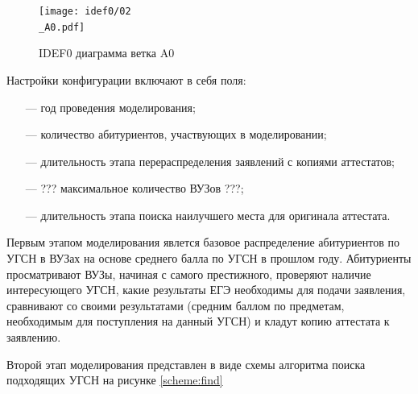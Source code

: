 \begin{figure}[hbtp]
	\centering
	\texttt{[image: idef0/02\\\_A0.pdf]}
	\caption{IDEF0 диаграмма ветка A0}
	\label{A0}
\end{figure}

Настройки конфигурации включают в себя поля:

\begin{itemize}[leftmargin=1.6\parindent]
	\item[---] год проведения моделирования;
	\item[---] количество абитуриентов, участвующих в моделировании;
	\item[---] длительность этапа перераспределения заявлений с копиями аттестатов;
	\item[---] ??? максимальное количество ВУЗов ???;
	\item[---] длительность этапа поиска наилучшего места для оригинала аттестата.

\end{itemize}

Первым этапом моделирования явлется базовое распределение абитуриентов по УГСН в ВУЗах на основе среднего балла по УГСН в прошлом году. Абитуриенты просматривают ВУЗы, начиная с самого престижного, проверяют наличие интересующего УГСН, какие результаты ЕГЭ необходимы для подачи заявления, сравнивают со своими результатами (средним баллом по предметам, необходимым для поступления на данный УГСН) и кладут копию аттестата к заявлению.

Второй этап моделирования представлен в виде схемы алгоритма поиска подходящих УГСН на рисунке \ref{scheme:find}

